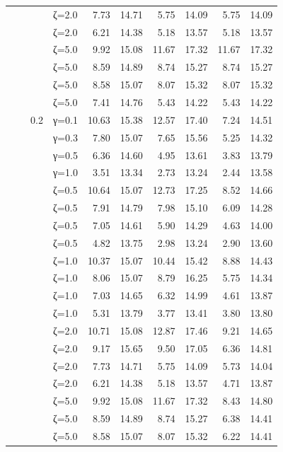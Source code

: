 \begin{table}[htbp]
\begin{tabular}{ll r l  rr  rr  rr}
  &  &  & ζ=2.0 & 7.73 & 14.71 & 5.75 & 14.09 & 5.75 & 14.09 \\
  &  &  & ζ=2.0 & 6.21 & 14.38 & 5.18 & 13.57 & 5.18 & 13.57 \\
  &  &  & ζ=5.0 & 9.92 & 15.08 & 11.67 & 17.32 & 11.67 & 17.32 \\
  &  &  & ζ=5.0 & 8.59 & 14.89 & 8.74 & 15.27 & 8.74 & 15.27 \\
  &  &  & ζ=5.0 & 8.58 & 15.07 & 8.07 & 15.32 & 8.07 & 15.32 \\
  &  &  & ζ=5.0 & 7.41 & 14.76 & 5.43 & 14.22 & 5.43 & 14.22 \\
  &  & 0.2 & γ=0.1 & 10.63 & 15.38 & 12.57 & 17.40 & 7.24 & 14.51 \\
  &  &  & γ=0.3 & 7.80 & 15.07 & 7.65 & 15.56 & 5.25 & 14.32 \\
  &  &  & γ=0.5 & 6.36 & 14.60 & 4.95 & 13.61 & 3.83 & 13.79 \\
  &  &  & γ=1.0 & 3.51 & 13.34 & 2.73 & 13.24 & 2.44 & 13.58 \\
  &  &  & ζ=0.5 & 10.64 & 15.07 & 12.73 & 17.25 & 8.52 & 14.66 \\
  &  &  & ζ=0.5 & 7.91 & 14.79 & 7.98 & 15.10 & 6.09 & 14.28 \\
  &  &  & ζ=0.5 & 7.05 & 14.61 & 5.90 & 14.29 & 4.63 & 14.00 \\
  &  &  & ζ=0.5 & 4.82 & 13.75 & 2.98 & 13.24 & 2.90 & 13.60 \\
  &  &  & ζ=1.0 & 10.37 & 15.07 & 10.44 & 15.42 & 8.88 & 14.43 \\
  &  &  & ζ=1.0 & 8.06 & 15.07 & 8.79 & 16.25 & 5.75 & 14.34 \\
  &  &  & ζ=1.0 & 7.03 & 14.65 & 6.32 & 14.99 & 4.61 & 13.87 \\
  &  &  & ζ=1.0 & 5.31 & 13.79 & 3.77 & 13.41 & 3.80 & 13.80 \\
  &  &  & ζ=2.0 & 10.71 & 15.08 & 12.87 & 17.46 & 9.21 & 14.65 \\
  &  &  & ζ=2.0 & 9.17 & 15.65 & 9.50 & 17.05 & 6.36 & 14.81 \\
  &  &  & ζ=2.0 & 7.73 & 14.71 & 5.75 & 14.09 & 5.73 & 14.04 \\
  &  &  & ζ=2.0 & 6.21 & 14.38 & 5.18 & 13.57 & 4.71 & 13.87 \\
  &  &  & ζ=5.0 & 9.92 & 15.08 & 11.67 & 17.32 & 8.43 & 14.80 \\
  &  &  & ζ=5.0 & 8.59 & 14.89 & 8.74 & 15.27 & 6.38 & 14.41 \\
  &  &  & ζ=5.0 & 8.58 & 15.07 & 8.07 & 15.32 & 6.22 & 14.41 \\

\end{tabular}
\end{table}
